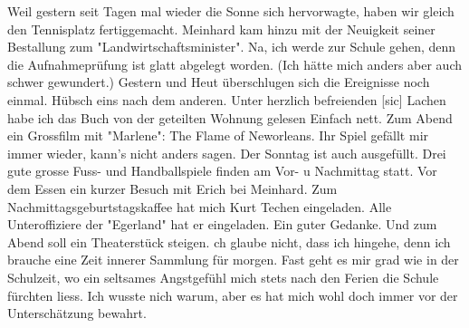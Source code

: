\def\day{30. Mai 1943}
\mktitle

Weil gestern seit Tagen mal wieder die Sonne sich hervorwagte, haben wir gleich den Tennisplatz fertiggemacht.
Meinhard kam hinzu mit der Neuigkeit seiner Bestallung zum "Landwirtschaftsminister".
Na, ich werde zur Schule gehen, denn die Aufnahmepr\"{u}fung ist glatt abgelegt worden.
(Ich h\"{a}tte mich anders aber auch schwer gewundert.)
Gestern und Heut \"{u}berschlugen sich die Ereignisse noch einmal.
H\"{u}bsch eins nach dem anderen.
Unter herzlich befreienden{\color{red} [sic] } Lachen habe ich das Buch von der geteilten Wohnung gelesen
Einfach nett.
Zum Abend ein Grossfilm mit "Marlene": The Flame of Neworleans.
Ihr Spiel gef\"{a}llt mir immer wieder, kann's nicht anders sagen.
Der Sonntag ist auch ausgef\"{u}llt.
Drei gute grosse Fuss- und Handballspiele finden am Vor- u Nachmittag statt.
Vor dem Essen ein kurzer Besuch mit Erich bei Meinhard.
Zum Nachmittagsgeburtstagskaffee hat mich Kurt Techen eingeladen.
Alle Unteroffiziere der "Egerland" hat er eingeladen.
Ein guter Gedanke.
Und zum Abend soll ein Theaterst\"{u}ck steigen.
ch glaube nicht, dass ich hingehe, denn ich brauche eine Zeit innerer Sammlung f\"{u}r morgen.
Fast geht es mir grad wie in der Schulzeit, wo ein seltsames Angstgef\"{u}hl mich stets nach den Ferien die Schule f\"{u}rchten liess.
Ich wusste nich warum, aber es hat mich wohl doch immer vor der Untersch\"{a}tzung bewahrt.

\clearpage

